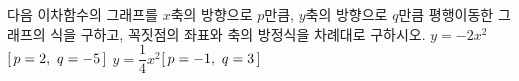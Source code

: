 다음 이차함수의 그래프를 $x$축의 방향으로 $p$만큼, $y$축의 방향으로 $q$만큼 평행이동한 그래프의 식을 구하고, 꼭짓점의 좌표와 축의 방정식을 차례대로 구하시오.
 $y=-2x^2$\quad$[\mkern3mu p=2,\ q=-5\mkern3mu ]$
 $y=\dfrac{1}{4}x^2$\quad$[\mkern3mu p=-1,\ q=3\mkern3mu ]$
